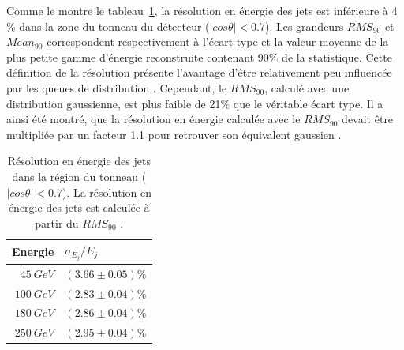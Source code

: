 Comme le montre le tableau~\ref{tab.jetResultAHCAL}, la résolution en énergie des jets est inférieure à 4 $\%$ dans la zone du tonneau du détecteur ($|cos\theta|<0.7$). Les grandeurs $RMS_{90}$ et $Mean_{90}$ correspondent respectivement à l'écart type et la valeur moyenne de la plus petite gamme d'énergie reconstruite contenant 90$\%$ de la statistique. Cette définition de la résolution présente l'avantage d'être relativement peu influencée par les queues de distribution \cite{pfaPandora}. Cependant, le $RMS_{90}$, calculé avec une distribution gaussienne, est plus faible de 21$\%$ que le véritable écart type. Il a ainsi été montré, que la résolution en énergie calculée avec le $RMS_{90}$ devait être multipliée par un facteur 1.1 pour retrouver son équivalent gaussien \cite{pfaPandora}.
\begin{table}[!ht]
  \begin{center}
    \begin{tabular}{r|l}
      \rowcolor{black!20!white} Energie & $\sigma_{E_j}/E_j$ \\
      \hline
      \rowcolor{black!5!white} $45 ~GeV$ & $(3.66\pm0.05)\%$\\
      \rowcolor{black!5!white} $100~GeV$ &$(2.83\pm0.04)\%$\\
      \rowcolor{black!5!white} $180~GeV$ &$(2.86\pm0.04)\%$\\
      \rowcolor{black!5!white} $250~GeV$ &$(2.95\pm0.04)\%$\\
    \end{tabular}
  \end{center}  
  \caption{Résolution en énergie des jets dans la région du tonneau ($|cos\theta|<0.7$). La résolution en énergie des jets est calculée à partir du $RMS_{90}$ \cite{detectorTDR}.}
  \label{tab.jetResultAHCAL}
\end{table}

